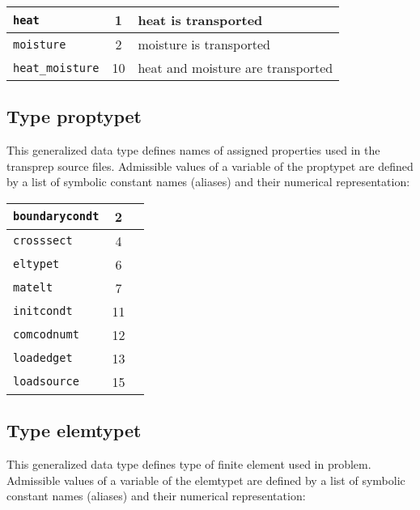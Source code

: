 \begin{center}
\begin{tabular}{|l|c|l|}
\hline
{\tt heat} & 1 & heat is transported
\\ \hline
{\tt moisture} & 2 & moisture is transported
\\ \hline
{\tt heat\_moisture} & 10 & heat and moisture are transported
\\ \hline
\end{tabular}
\end{center}

\subsection{Type {\sf proptypet}}
\label{sectproptypet}

This generalized data type defines names of assigned properties used in the transprep source files.
Admissible values of a variable of the {\sf proptypet} are defined by a list of symbolic constant names (aliases)
and their numerical representation:

\begin{center}
\begin{tabular}{|l|c|l|}
\hline
{\tt boundarycondt} & 2 &
\\ \hline
{\tt crosssect} & 4 &
\\ \hline
{\tt eltypet} & 6 &
\\ \hline
{\tt matelt} & 7 &
\\ \hline
{\tt initcondt} & 11 &
\\ \hline
{\tt comcodnumt} & 12 &
\\ \hline
{\tt loadedget} & 13 &
\\ \hline
{\tt loadsource} & 15 &
\\ \hline
\end{tabular}
\end{center}

\subsection{Type {\sf elemtypet}}
\label{sectelemtypet}

This generalized data type defines type of finite element used in problem.
Admissible values of a variable of the {\sf elemtypet} are defined by a list of symbolic constant names (aliases)
and their numerical representation:


